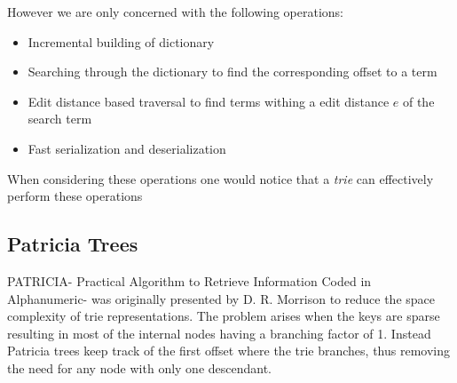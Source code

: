 However we are only concerned with the following operations:
\begin{itemize}
\item Incremental building of dictionary
\item Searching through the dictionary to find the corresponding offset to a term
\item Edit distance based traversal to find terms withing a edit distance $e$ of the search term
\item Fast serialization and deserialization
\end{itemize}
When considering these operations one would notice that a \textit{trie}\cite{fredkin1960trie} can effectively perform these operations

\subsection{Patricia Trees}
PATRICIA- Practical Algorithm to Retrieve Information Coded in Alphanumeric- was originally presented by D. R. Morrison\cite{morrison1968patricia}
to reduce the space complexity of trie representations.
The problem arises when the keys are sparse resulting in most of the internal nodes having a branching factor of 1.
Instead Patricia trees keep track of the first offset where the trie branches, thus removing the need for any node with only one descendant.

